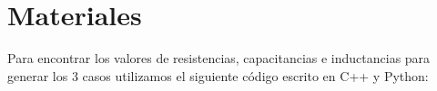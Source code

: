\documentclass[a4paper,12pt]{report}
\begin{document}
\section{Materiales}
Para encontrar los valores de resistencias, capacitancias e inductancias para generar los 3 casos utilizamos el siguiente código escrito en C++ y Python:

\end{document}
